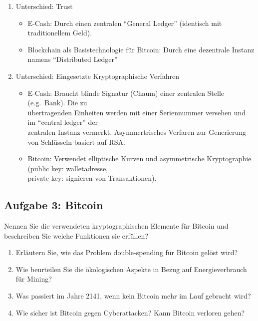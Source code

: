 \documentclass[11pt]{article}
\providecommand{\tightlist}{%
      \setlength{\itemsep}{0pt}\setlength{\parskip}{0pt}}
\begin{document}
\begin{enumerate}
\def\labelenumi{\arabic{enumi}.}
\item
  Unterschied: Trust

  \begin{itemize}
  \item
    E-Cash: Durch einen zentralen ``General Ledger'' (identisch mit
    traditionellem Geld).
  \item
    Blockchain als Basistechnologie für Bitcoin: Durch eine dezentrale
    Instanz namens ``Distributed Ledger''
  \end{itemize}
\item
  Unterschied: Eingesetzte Kryptographische Verfahren

  \begin{itemize}
  \item
    E-Cash: Braucht blinde Signatur (Chaum) einer zentralen Stelle
    (e.g.~Bank). Die zu\\
    übertragenden Einheiten werden mit einer Seriennummer versehen und
    im ``central ledger'' der\\
    zentralen Instanz vermerkt. Asymmertrisches Verfaren zur Generierung
    von Schlüsseln basiert auf RSA.
  \item
    Bitcoin: Verwendet elliptische Kurven und asymmetrische
    Kryptographie (public key: walletadresse,\\
    private key: signieren von Transaktionen).
  \end{itemize}
\end{enumerate}

    \hypertarget{aufgabe-3-bitcoin}{%
\subsection{Aufgabe 3: Bitcoin}\label{aufgabe-3-bitcoin}}

Nennen Sie die verwendeten kryptographischen Elemente für Bitcoin und
beschreiben Sie welche Funktionen sie erfüllen?

\begin{enumerate}
\def\labelenumi{\alph{enumi})}
\tightlist
\item
  Erläutern Sie, wie das Problem double-spending für Bitcoin gelöst
  wird?\\
\item
  Wie beurteilen Sie die ökologischen Aspekte in Bezug auf
  Energieverbrauch für Mining?\\
\item
  Was passiert im Jahre 2141, wenn kein Bitcoin mehr im Lauf gebracht
  wird?\\
\item
  Wie sicher ist Bitcoin gegen Cyberattacken? Kann Bitcoin verloren
  gehen?
\end{enumerate}
\end{document}
